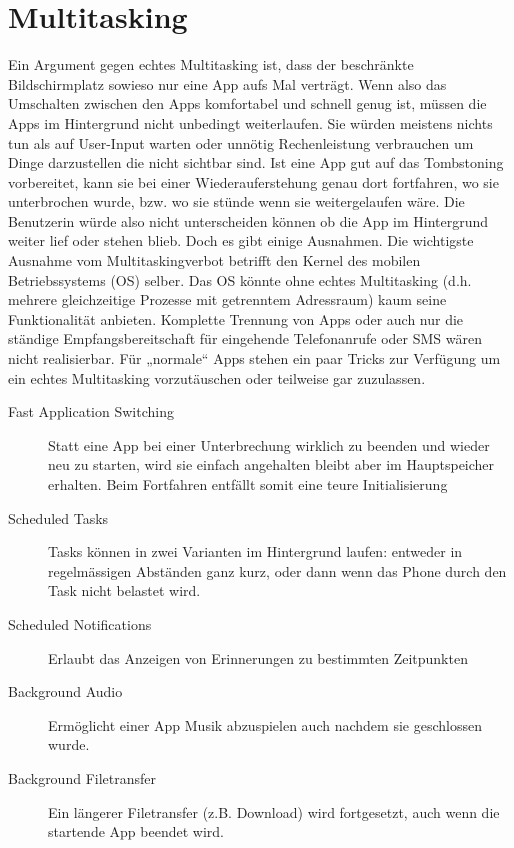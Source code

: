 \documentclass[a4paper,10pt]{scrreprt}
\begin{document}
\chapter{Multitasking}
Ein Argument gegen echtes Multitasking ist, dass der beschränkte Bildschirmplatz sowieso nur eine App aufs
Mal verträgt. Wenn also das Umschalten zwischen den Apps komfortabel und schnell genug ist, müssen die
Apps im Hintergrund nicht unbedingt weiterlaufen. Sie würden meistens nichts tun als auf User-Input warten
oder unnötig Rechenleistung verbrauchen um Dinge darzustellen die nicht sichtbar sind.
Ist eine App gut auf das Tombstoning vorbereitet, kann sie bei einer Wiederauferstehung genau dort fortfahren,
wo sie unterbrochen wurde, bzw. wo sie stünde wenn sie weitergelaufen wäre. Die Benutzerin würde also nicht
unterscheiden können ob die App im Hintergrund weiter lief oder stehen blieb.
Doch es gibt einige Ausnahmen. Die wichtigste Ausnahme vom Multitaskingverbot betrifft den Kernel des
mobilen Betriebssystems (OS) selber. Das OS könnte ohne echtes Multitasking (d.h. mehrere gleichzeitige
Prozesse mit getrenntem Adressraum) kaum seine Funktionalität anbieten. Komplette Trennung von Apps oder
auch nur die ständige Empfangsbereitschaft für eingehende Telefonanrufe oder SMS wären nicht realisierbar.
Für „normale“ Apps stehen ein paar Tricks zur Verfügung um ein echtes Multitasking vorzutäuschen oder
teilweise gar zuzulassen.
\begin{description}
\item[Fast Application Switching]Statt eine App bei einer Unterbrechung wirklich zu beenden und wieder neu zu starten, wird sie einfach
angehalten bleibt aber im Hauptspeicher erhalten. Beim Fortfahren entfällt somit eine teure Initialisierung
\item[Scheduled Tasks] Tasks können in zwei Varianten im Hintergrund laufen: entweder in regelmässigen Abständen ganz kurz,
oder dann wenn das Phone durch den Task nicht belastet wird.
\item[Scheduled Notifications] Erlaubt das Anzeigen von Erinnerungen zu bestimmten Zeitpunkten
\item[Background Audio] Ermöglicht einer App Musik abzuspielen auch nachdem sie geschlossen wurde.
\item[Background Filetransfer] Ein längerer Filetransfer (z.B. Download) wird fortgesetzt, auch wenn die startende App beendet wird.
\end{description}
\end{document}
